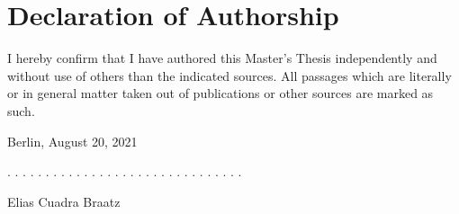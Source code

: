 \documentclass[a4paper,11pt]{article}
\newcommand{\thesistype}{Master's Thesis}
\newcommand{\thesisauthor}{Elias Cuadra Braatz}
\newcommand{\thesisdate}{August 20, 2021}
\begin{document}




\newpage
\thispagestyle{empty}
\hypertarget{declaration-of-authorship}{%
\section*{Declaration of Authorship}\label{declaration-of-authorship}}

I hereby confirm that I have authored this \thesistype{} independently and
without use of others than the indicated sources. All passages which are
literally or in general matter taken out of publications or other sources are
marked as such.
\vspace{1cm}

Berlin, \thesisdate{}
\vspace{3cm}

. . . . . . . . . . . . . . . . . . . . . . . . . . . . . . .
\vspace{0.1cm}

\thesisauthor{}
\end{document}
